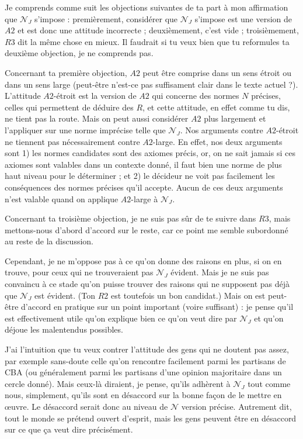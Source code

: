 \documentclass[preprint, french, english, 11pt, authoryear]{elsarticle}%
\newcommand{\adv}{\mathscr{N}}
\newcommand{\fadv}{\mathscr{N}_J}%
\begin{document}
Je comprends comme suit les objections suivantes de ta part à mon affirmation que $\fadv$ s’impose : premièrement, considérer que $\fadv$ s’impose est une version de $A2$ et est donc une attitude incorrecte ; deuxièmement, c’est vide ; troisièmement, $R3$ dit la même chose en mieux. Il faudrait si tu veux bien que tu reformules ta deuxième objection, je ne comprends pas.

Concernant ta première objection, $A2$ peut être comprise dans un sens étroit ou dans un sens large (peut-être n’est-ce pas suffisament clair dans le texte actuel ?). L’attitude $A2$-étroit est la version de $A2$ qui concerne des normes $N$ précises, celles qui permettent de déduire des $R$, et cette attitude, en effet comme tu dis, ne tient pas la route. Mais on peut aussi considérer $A2$ plus largement et l’appliquer sur une norme imprécise telle que $\fadv$. Nos arguments contre $A2$-étroit ne tiennent pas nécessairement contre $A2$-large. En effet, nos deux arguments sont 1) les normes candidates sont des axiomes précis, or, on ne sait jamais si ces axiomes sont valables dans un contexte donné, il faut bien une norme de plus haut niveau pour le déterminer ; et 2) le décideur ne voit pas facilement les conséquences des normes précises qu’il accepte. Aucun de ces deux arguments n’est valable quand on applique $A2$-large à $\fadv$.

Concernant ta troisième objection, je ne suis pas sûr de te suivre dans $R3$, mais mettons-nous d’abord d’accord sur le reste, car ce point me semble subordonné au reste de la discussion.

Cependant, je ne m’oppose pas à ce qu’on donne des raisons en plus, si on en trouve, pour ceux qui ne trouveraient pas $\fadv$ évident. Mais je ne suis pas convaincu à ce stade qu’on puisse trouver des raisons qui ne supposent pas déjà que $\fadv$ est évident. (Ton $R2$ est toutefois un bon candidat.) Mais on est peut-être d’accord en pratique sur un point important (voire suffisant) : je pense qu’il est effectivement utile qu’on explique bien ce qu’on veut dire par $\fadv$ et qu’on déjoue les malentendus possibles.

J’ai l’intuition que tu veux contrer l’attitude des gens qui ne doutent pas assez, par exemple sans-doute celle qu’on rencontre facilement parmi les partisans de CBA (ou généralement parmi les partisans d’une opinion majoritaire dans un cercle donné). Mais ceux-là diraient, je pense, qu’ils adhèrent à $\fadv$ tout comme nous, simplement, qu’ils sont en désaccord sur la bonne façon de le mettre en œuvre. Le désaccord serait donc au niveau de $\adv$ version précise. Autrement dit, tout le monde se prétend ouvert d’esprit, mais les gens peuvent être en désaccord sur ce que ça veut dire précisément.
\end{document}
